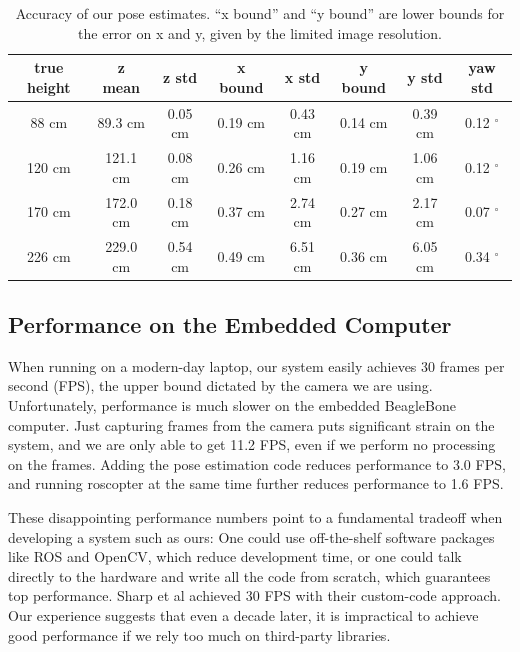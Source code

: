 \documentclass[10pt]{scrartcl} %
\begin{document}
\begin{table}[h!]
    \centering
    \begin{tabular}{c|cc|cc|cc|c}
        true height & z mean    & z std     & x bound   & x std     & y bound   & y std     & yaw std \\
        \hline
         88 cm      & 89.3 cm   & 0.05 cm   & 0.19 cm   & 0.43 cm   & 0.14 cm   & 0.39 cm   & 0.12 $^{\circ}$ \\
        120 cm      & 121.1 cm  & 0.08 cm   & 0.26 cm   & 1.16 cm   & 0.19 cm   & 1.06 cm   & 0.12 $^{\circ}$ \\
        170 cm      & 172.0 cm  & 0.18 cm   & 0.37 cm   & 2.74 cm   & 0.27 cm   & 2.17 cm   & 0.07 $^{\circ}$ \\
        226 cm      & 229.0 cm  & 0.54 cm   & 0.49 cm   & 6.51 cm   & 0.36 cm   & 6.05 cm   & 0.34 $^{\circ}$ \\
    \end{tabular}
    \caption{
        Accuracy of our pose estimates. ``x bound'' and ``y bound'' are lower
        bounds for the error on x and y, given by the limited image resolution.
    }
    \label{tab:pose-accu}
\end{table}

\subsection{Performance on the Embedded Computer}

When running on a modern-day laptop, our system easily achieves 30 frames per
second (FPS), the upper bound dictated by the camera we are using.
Unfortunately, performance is much slower on the embedded BeagleBone computer.
Just capturing frames from the camera puts significant strain on the system,
and we are only able to get 11.2 FPS, even if we perform no processing on the
frames. Adding the pose estimation code reduces performance to 3.0 FPS, and
running roscopter at the same time further reduces performance to 1.6 FPS.

These disappointing performance numbers point to a fundamental tradeoff when
developing a system such as ours: One could use off-the-shelf software packages
like ROS and OpenCV, which reduce development time, or one could talk directly
to the hardware and write all the code from scratch, which guarantees top
performance. Sharp et al \cite{sharp_et_al_2001} achieved 30 FPS with their
custom-code approach. Our experience suggests that even a decade later, it is
impractical to achieve good performance if we rely too much on third-party
libraries.
\end{document}
